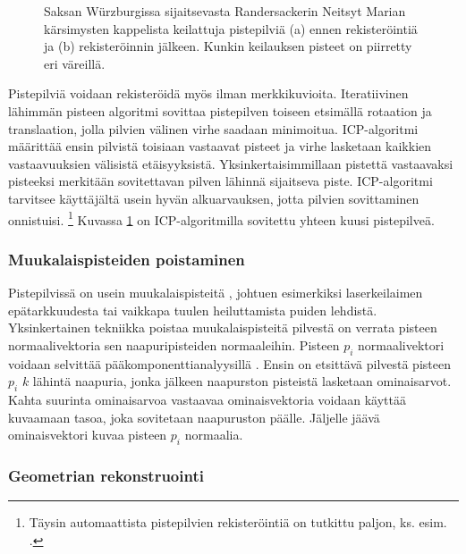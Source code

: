 \begin{figure}
\begin{subfigure}{.5\textwidth}
        \caption{}
    \end{subfigure}
    \caption{Saksan Würzburgissa sijaitsevasta Randersackerin Neitsyt Marian kärsimysten kappelista keilattuja pistepilviä (a) ennen rekisteröintiä ja (b) rekisteröinnin jälkeen. Kunkin keilauksen pisteet on piirretty eri väreillä.}
    \label{img:reg}
\end{figure}

Pistepilviä voidaan rekisteröidä myös ilman merkkikuvioita. Iteratiivinen lähimmän pisteen algoritmi  sovittaa pistepilven toiseen etsimällä rotaation ja translaation, jolla pilvien välinen virhe saadaan minimoitua. ICP-algoritmi määrittää ensin pilvistä toisiaan vastaavat pisteet ja virhe lasketaan kaikkien vastaavuuksien välisistä etäisyyksistä. Yksinkertaisimmillaan pistettä vastaavaksi pisteeksi merkitään sovitettavan pilven lähinnä sijaitseva piste. 
ICP-algoritmi tarvitsee käyttäjältä usein hyvän alkuarvauksen, jotta pilvien sovittaminen onnistuisi. 
\footnote{Täysin automaattista pistepilvien rekisteröintiä on tutkittu paljon, ks. esim. \cite{Pascal}.} Kuvassa \ref{img:reg} on ICP-algoritmilla sovitettu yhteen kuusi pistepilveä. 


\subsubsection{Muukalaispisteiden poistaminen}

Pistepilvissä on usein muukalaispisteitä , johtuen esimerkiksi laserkeilaimen epätarkkuudesta tai vaikkapa tuulen heiluttamista puiden lehdistä. Yksinkertainen tekniikka poistaa muukalaispisteitä pilvestä on verrata pisteen normaalivektoria sen naapuripisteiden normaaleihin. Pisteen $p_i$ normaalivektori voidaan selvittää pääkomponenttianalyysillä . Ensin on etsittävä pilvestä pisteen $p_i$ $k$ lähintä naapuria, jonka jälkeen naapurston pisteistä lasketaan ominaisarvot. Kahta suurinta ominaisarvoa vastaavaa ominaisvektoria voidaan käyttää kuvaamaan tasoa, joka sovitetaan naapuruston päälle. Jäljelle jäävä ominaisvektori kuvaa pisteen $p_i$ normaalia. \cite{huang}

\subsubsection{Geometrian rekonstruointi}

